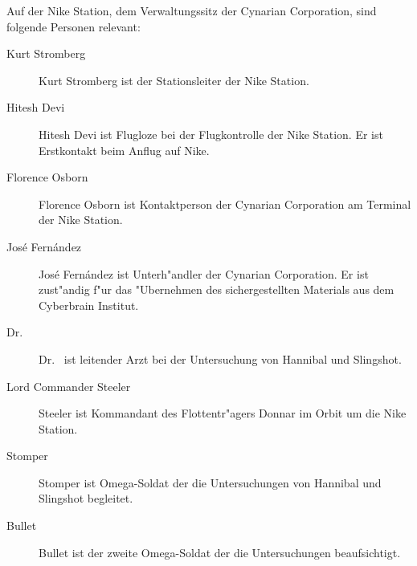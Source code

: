 
Auf der Nike Station, dem Verwaltungssitz der Cynarian Corporation, sind folgende Personen relevant:

\begin{description}
    \item [Kurt Stromberg] Kurt Stromberg ist der Stationsleiter der Nike Station.
    \item [Hitesh Devi] Hitesh Devi ist Flugloze bei der Flugkontrolle der Nike Station. Er ist Erstkontakt beim Anflug auf Nike.
    \item [Florence Osborn] Florence Osborn ist Kontaktperson der Cynarian Corporation am Terminal der Nike Station.
    \item [Jos\'e Fern\'andez] Jos\'e Fern\'andez ist Unterh"andler der Cynarian Corporation. Er ist zust"andig f"ur das "Ubernehmen des 
        sichergestellten Materials aus dem Cyberbrain Institut.
    \item [Dr.~ ] Dr.~  ist leitender Arzt bei der Untersuchung von Hannibal und 
        Slingshot.
    \item [Lord Commander Steeler] Steeler ist Kommandant des Flottentr"agers Donnar im Orbit um die Nike Station.
    \item [Stomper] Stomper ist Omega-Soldat der die Untersuchungen von Hannibal und Slingshot begleitet.
    \item [Bullet] Bullet ist der zweite Omega-Soldat der die Untersuchungen beaufsichtigt.
\end{description}
